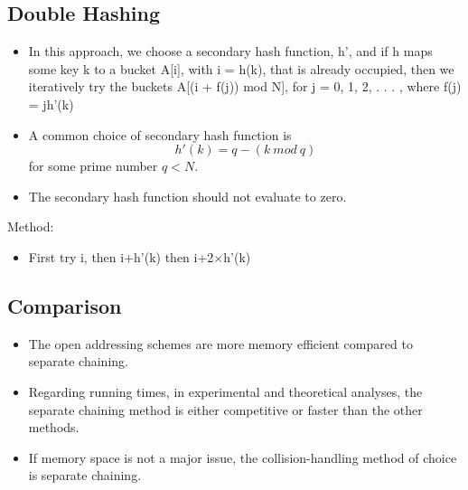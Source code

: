 \documentclass{article}[18pt]
\begin{document}
\subsection{Double Hashing}
\begin{itemize}
\item In this approach, we choose a secondary hash function, h', and if h maps some key k to a bucket A[i], with i = h(k), that is already occupied, then we iteratively try the buckets
A[(i + f(j)) mod N], for j = 0, 1, 2, . . . , where f(j) = jh'(k)
\item A common choice of secondary hash function is 
$$h'(k) = q - (k \ mod \ q)$$
for some prime number $q < N$.
\item The secondary hash function should not evaluate to zero.
\end{itemize}
Method:
\begin{itemize}
\item First try i, then i+h'(k) then i+2$\times$h'(k)
\end{itemize}
\subsection{Comparison}
\begin{itemize}
\item The open addressing schemes are more memory efficient
compared to separate chaining.
\item Regarding running times, in experimental and theoretical
analyses, the separate chaining method is either
competitive or faster than the other methods.
\item If memory space is not a major issue, the
collision-handling method of choice is separate chaining.
\end{itemize}
\end{document}
